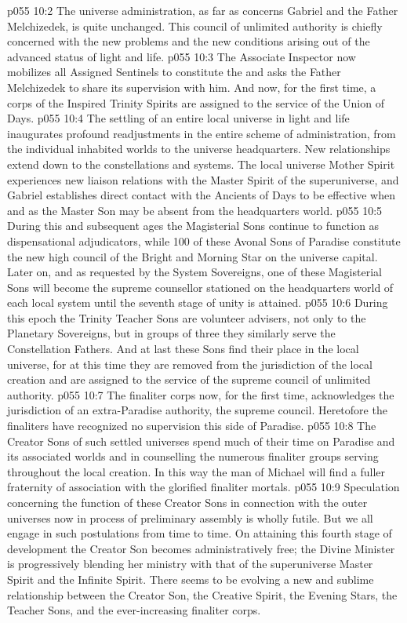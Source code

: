 \vs p055 10:2 The universe administration, as far as concerns Gabriel and the Father Melchizedek, is quite unchanged. This council of unlimited authority is chiefly concerned with the new problems and the new conditions arising out of the advanced status of light and life.
\vs p055 10:3 \pc The Associate Inspector now mobilizes all Assigned Sentinels to constitute the  and asks the Father Melchizedek to share its supervision with him. And now, for the first time, a corps of the Inspired Trinity Spirits are assigned to the service of the Union of Days.
\vs p055 10:4 \pc The settling of an entire local universe in light and life inaugurates profound readjustments in the entire scheme of administration, from the individual inhabited worlds to the universe headquarters. New relationships extend down to the constellations and systems. The local universe Mother Spirit experiences new liaison relations with the Master Spirit of the superuniverse, and Gabriel establishes direct contact with the Ancients of Days to be effective when and as the Master Son may be absent from the headquarters world.
\vs p055 10:5 During this and subsequent ages the Magisterial Sons continue to function as dispensational adjudicators, while 100 of these Avonal Sons of Paradise constitute the new high council of the Bright and Morning Star on the universe capital. Later on, and as requested by the System Sovereigns, one of these Magisterial Sons will become the supreme counsellor stationed on the headquarters world of each local system until the seventh stage of unity is attained.
\vs p055 10:6 During this epoch the Trinity Teacher Sons are volunteer advisers, not only to the Planetary Sovereigns, but in groups of three they similarly serve the Constellation Fathers. And at last these Sons find their place in the local universe, for at this time they are removed from the jurisdiction of the local creation and are assigned to the service of the supreme council of unlimited authority.
\vs p055 10:7 \pc The finaliter corps now, for the first time, acknowledges the jurisdiction of an extra\hyp{}Paradise authority, the supreme council. Heretofore the finaliters have recognized no supervision this side of Paradise.
\vs p055 10:8 The Creator Sons of such settled universes spend much of their time on Paradise and its associated worlds and in counselling the numerous finaliter groups serving throughout the local creation. In this way the man of Michael will find a fuller fraternity of association with the glorified finaliter mortals.
\vs p055 10:9 \pc Speculation concerning the function of these Creator Sons in connection with the outer universes now in process of preliminary assembly is wholly futile. But we all engage in such postulations from time to time. On attaining this fourth stage of development the Creator Son becomes administratively free; the Divine Minister is progressively blending her ministry with that of the superuniverse Master Spirit and the Infinite Spirit. There seems to be evolving a new and sublime relationship between the Creator Son, the Creative Spirit, the Evening Stars, the Teacher Sons, and the ever\hyp{}increasing finaliter corps.
